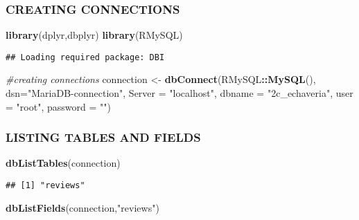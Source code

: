 \documentclass[
]{article}
\newenvironment{Shaded}{\begin{snugshade}}{\end{snugshade}}
\newcommand{\AttributeTok}[1]{\textcolor[rgb]{0.13,0.29,0.53}{#1}}
\newcommand{\CommentTok}[1]{\textcolor[rgb]{0.56,0.35,0.01}{\textit{#1}}}
\newcommand{\FunctionTok}[1]{\textcolor[rgb]{0.13,0.29,0.53}{\textbf{#1}}}
\newcommand{\NormalTok}[1]{#1}
\newcommand{\OtherTok}[1]{\textcolor[rgb]{0.56,0.35,0.01}{#1}}
\newcommand{\SpecialCharTok}[1]{\textcolor[rgb]{0.81,0.36,0.00}{\textbf{#1}}}
\newcommand{\StringTok}[1]{\textcolor[rgb]{0.31,0.60,0.02}{#1}}
\begin{document}
\hypertarget{creating-connections}{%
\subsubsection{CREATING CONNECTIONS}\label{creating-connections}}

\begin{Shaded}
\begin{Highlighting}[]
\FunctionTok{library}\NormalTok{(dplyr,dbplyr)}
\FunctionTok{library}\NormalTok{(RMySQL)}
\end{Highlighting}
\end{Shaded}

\begin{verbatim}
## Loading required package: DBI
\end{verbatim}

\begin{Shaded}
\begin{Highlighting}[]
\CommentTok{\#creating connections}
\NormalTok{connection }\OtherTok{\textless{}{-}} \FunctionTok{dbConnect}\NormalTok{(RMySQL}\SpecialCharTok{::}\FunctionTok{MySQL}\NormalTok{(),}
                        \AttributeTok{dsn=}\StringTok{"MariaDB{-}connection"}\NormalTok{,}
                        \AttributeTok{Server =} \StringTok{"localhost"}\NormalTok{,}
                        \AttributeTok{dbname =} \StringTok{"2c\_echaveria"}\NormalTok{, }
                        \AttributeTok{user =} \StringTok{"root"}\NormalTok{, }
                        \AttributeTok{password =} \StringTok{""}\NormalTok{) }
\end{Highlighting}
\end{Shaded}

\hypertarget{listing-tables-and-fields}{%
\subsubsection{LISTING TABLES AND
FIELDS}\label{listing-tables-and-fields}}

\begin{Shaded}
\begin{Highlighting}[]
\FunctionTok{dbListTables}\NormalTok{(connection)}
\end{Highlighting}
\end{Shaded}

\begin{verbatim}
## [1] "reviews"
\end{verbatim}

\begin{Shaded}
\begin{Highlighting}[]
\FunctionTok{dbListFields}\NormalTok{(connection,}\StringTok{"reviews"}\NormalTok{)}
\end{Highlighting}
\end{Shaded}
\end{document}
